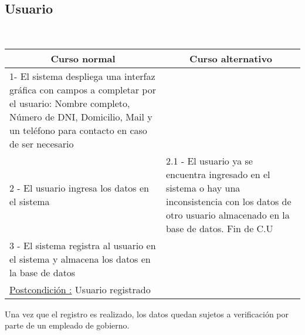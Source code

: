 \subsection{Usuario}

~


\begin{center}
    \centering
    \begin{tabular}{ | p{11cm} | p{6cm} | }
    	\multicolumn{1}{c}{\cellcolor{black!30}\textbf{Curso normal}} & 
    	\multicolumn{1}{c}{\cellcolor{black!30}\textbf{Curso alternativo}} \\
		\hline
		1- El sistema despliega una interfaz gráfica con campos a completar
		por el usuario: Nombre completo, Número de DNI, Domicilio, Mail y un teléfono
		para contacto en caso de ser necesario &  \\ \hline
		2 - El usuario ingresa los datos en el sistema & 2.1 - El usuario ya se encuentra ingresado en el sistema
		o hay una inconsistencia con los datos de otro usuario almacenado en la base de datos. Fin de C.U \\ \hline
		3 - El sistema registra al usuario en el sistema y almacena los datos en la base de datos & \\ \hline
		\underline{Postcondición :} Usuario registrado & \\ \hline
    \end{tabular}
\end{center}

Una vez que el registro es realizado, los datos quedan sujetos a verificación por parte de un empleado de gobierno.

~

